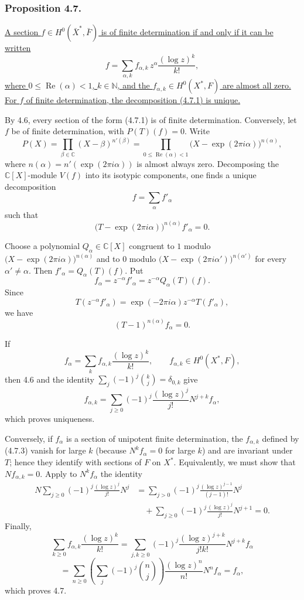 \subsubsection*{Proposition 4.7.}
\underline{A section $f\in H^0(\bar X^*,\bar F)$ is of finite
determination if and only if it can be written}
\begin{equation}\tag{4.7.1}
f=\sum_{\alpha,k}f_{\alpha,k}\,
z^\alpha\frac{(\log z)^k}{k!},
\end{equation}
\underline{where $0\leq\operatorname{Re}(\alpha)<1$,
$k\in\mathbb N$, and the
$f_{\alpha,k}\in H^0(X^*,F)$ are almost all zero.  For $f$ of finite
determination, the decomposition (4.7.1) is unique.}

By 4.6, every section of the form (4.7.1) is of finite determination.
Conversely, let $f$ be of finite determination, with $P(T)(f)=0$.
Write
\[
P(X)=\prod_{\beta\in\mathbb C}(X-\beta)^{n'(\beta)}
=\prod_{0\leq\operatorname{Re}(\alpha)<1}
 \bigl(X-\exp(2\pi i\alpha)\bigr)^{n(\alpha)},
\]
where
$n(\alpha)=n'(\exp(2\pi i\alpha))$ is almost always zero.
Decomposing the $\mathbb C[X]$-module $V(f)$ into its isotypic
components, one finds a unique decomposition
\[
f=\sum_\alpha f'_\alpha
\]
such that
\[
\bigl(T-\exp(2\pi i\alpha)\bigr)^{n(\alpha)}f'_\alpha=0.
\]

Choose a polynomial $Q_\alpha\in\mathbb C[X]$ congruent to $1$
modulo
$\bigl(X-\exp(2\pi i\alpha)\bigr)^{n(\alpha)}$ and to $0$ modulo
$\bigl(X-\exp(2\pi i\alpha')\bigr)^{n(\alpha')}$ for every
$\alpha'\ne\alpha$.  Then
$f'_\alpha=Q_\alpha(T)(f)$.  Put
\begin{equation}\tag{4.7.2}
f_\alpha=z^{-\alpha}f'_\alpha
=z^{-\alpha}Q_\alpha(T)(f).
\end{equation}
Since
\[
T(z^{-\alpha}f'_\alpha)
=\exp(-2\pi i\alpha)z^{-\alpha}T(f'_\alpha),
\]
we have
\[
(T-1)^{n(\alpha)}f_\alpha=0.
\]

If
\[
f_\alpha=\sum_k f_{\alpha,k}\frac{(\log z)^k}{k!},
\qquad f_{\alpha,k}\in H^0(X^*,F),
\]
then 4.6 and the identity
$\sum_j(-1)^j\binom{k}{j}=\delta_{0,k}$ give
\begin{equation}\tag{4.7.3}
f_{\alpha,k}
=\sum_{j\geq0}(-1)^j\frac{(\log z)^j}{j!}
  N^{j+k}f_\alpha,
\end{equation}
which proves uniqueness.

Conversely, if $f_\alpha$ is a section of unipotent finite
determination, the $f_{\alpha,k}$ defined by (4.7.3) vanish for large
$k$ (because $N^k f_\alpha=0$ for large $k$) and are invariant under
$T$; hence they identify with sections of $F$ on $X^*$.  Equivalently,
we must show that $Nf_{\alpha,k}=0$.  Apply to $N^k f_\alpha$ the
identity
\[
\begin{aligned}
N\sum_{j\geq0}(-1)^j\frac{(\log z)^j}{j!}N^j
&=\sum_{j>0}(-1)^j\frac{(\log z)^{j-1}}{(j-1)!}N^j\\
&\quad+\sum_{j\geq0}(-1)^j\frac{(\log z)^j}{j!}N^{j+1}=0.
\end{aligned}
\]
Finally,
\[
\sum_{k\geq0}f_{\alpha,k}\frac{(\log z)^k}{k!}
=\sum_{j,k\geq0}(-1)^j
 \frac{(\log z)^{j+k}}{j!k!}N^{j+k}f_\alpha
\]
\[
=\sum_{n\geq0}
 \left(\sum_j(-1)^j\binom nj\right)
 \frac{(\log z)^n}{n!}N^n f_\alpha
=f_\alpha,
\]
which proves 4.7.


